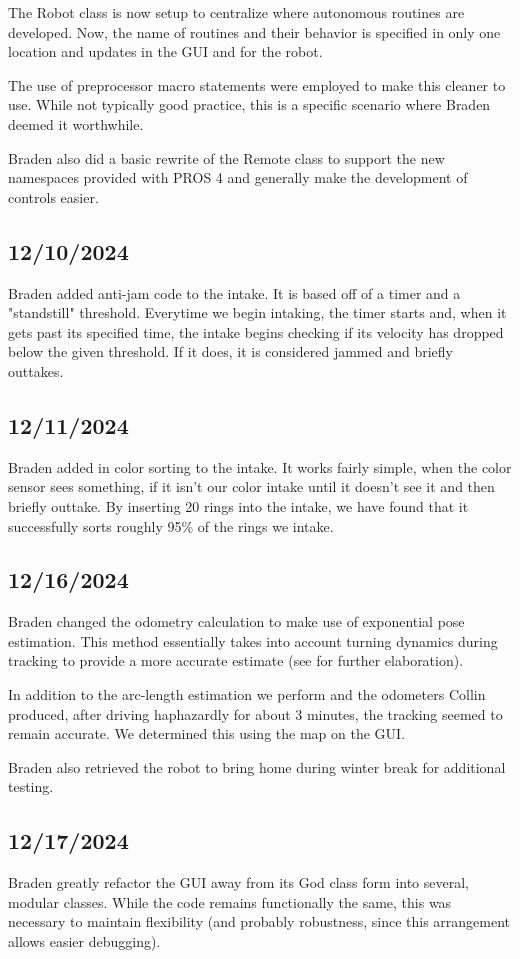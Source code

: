 The Robot class is now setup to centralize where autonomous routines are developed. Now, the name of routines and their behavior is specified in only one location and updates in the GUI and for the robot. 

The use of preprocessor macro statements were employed to make this cleaner to use. While not typically good practice, this is a specific scenario where Braden deemed it worthwhile. 

Braden also did a basic rewrite of the Remote class to support the new namespaces provided with PROS 4 and generally make the development of controls easier. 

\subsection{12/10/2024}
Braden added anti-jam code to the intake. It is based off of a timer and a "standstill" threshold. Everytime we begin intaking, the timer starts and, when it gets past its specified time, the intake begins checking if its velocity has dropped below the given threshold. If it does, it is considered jammed and briefly outtakes. 

\subsection{12/11/2024}
Braden added in color sorting to the intake. It works fairly simple, when the color sensor sees something, if it isn't our color intake until it doesn't see it and then briefly outtake. By inserting 20 rings into the intake, we have found that it successfully sorts roughly 95\% of the rings we intake. 

\subsection{12/16/2024}
Braden changed the odometry calculation to make use of exponential pose estimation. This method essentially takes into account turning dynamics during tracking to provide a more accurate estimate (see \cite{bib:controlinfrc} for further elaboration).

In addition to the arc-length estimation we perform and the odometers Collin produced, after driving haphazardly for about 3 minutes, the tracking seemed to remain accurate. We determined this using the map on the GUI. 

Braden also retrieved the robot to bring home during winter break for additional testing.

\subsection{12/17/2024}
Braden greatly refactor the GUI away from its God class form into several, modular classes. While the code remains functionally the same, this was necessary to maintain flexibility (and probably robustness, since this arrangement allows easier debugging). 